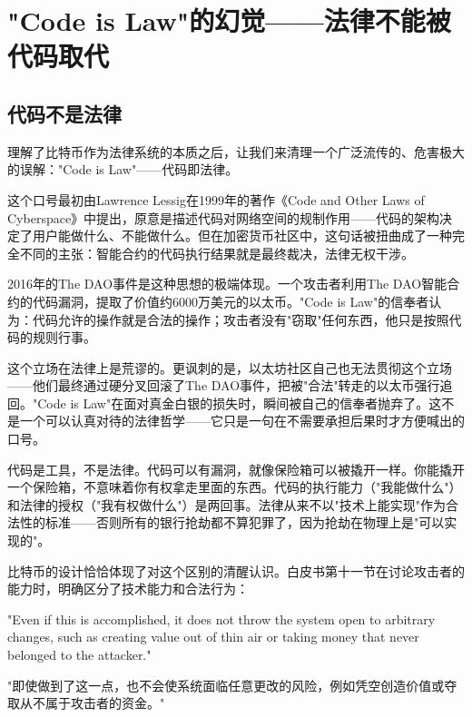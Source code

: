 \documentclass[a4paper,12pt,openany]{ctexbook}
\newenvironment{quoting}{%
  \par\vspace{0.5em}%
  \begin{list}{}{%
    \setlength{\leftmargin}{2em}%
    \setlength{\rightmargin}{2em}%
    \setlength{\parsep}{0.3em}%
    \setlength{\itemsep}{0pt}%
    \setlength{\topsep}{0pt}%
  }%
  \item\relax
}{%
  \end{list}%
  \par\vspace{0.5em}%
}
\begin{document}
\section*{"Code is Law"的幻觉——法律不能被代码取代}



\subsection*{代码不是法律}


理解了比特币作为法律系统的本质之后，让我们来清理一个广泛流传的、危害极大的误解："Code is Law"——代码即法律。

这个口号最初由Lawrence Lessig在1999年的著作《Code and Other Laws of Cyberspace》中提出，原意是描述代码对网络空间的规制作用——代码的架构决定了用户能做什么、不能做什么。但在加密货币社区中，这句话被扭曲成了一种完全不同的主张：智能合约的代码执行结果就是最终裁决，法律无权干涉。

2016年的The DAO事件是这种思想的极端体现。一个攻击者利用The DAO智能合约的代码漏洞，提取了价值约6000万美元的以太币。"Code is Law"的信奉者认为：代码允许的操作就是合法的操作；攻击者没有"窃取"任何东西，他只是按照代码的规则行事。

这个立场在法律上是荒谬的。更讽刺的是，以太坊社区自己也无法贯彻这个立场——他们最终通过硬分叉回滚了The DAO事件，把被"合法"转走的以太币强行追回。"Code is Law"在面对真金白银的损失时，瞬间被自己的信奉者抛弃了。这不是一个可以认真对待的法律哲学——它只是一句在不需要承担后果时才方便喊出的口号。

代码是工具，不是法律。代码可以有漏洞，就像保险箱可以被撬开一样。你能撬开一个保险箱，不意味着你有权拿走里面的东西。代码的执行能力（"我能做什么"）和法律的授权（"我有权做什么"）是两回事。法律从来不以"技术上能实现"作为合法性的标准——否则所有的银行抢劫都不算犯罪了，因为抢劫在物理上是"可以实现的"。

比特币的设计恰恰体现了对这个区别的清醒认识。白皮书第十一节在讨论攻击者的能力时，明确区分了技术能力和合法行为：


\begin{quoting}
\small
"Even if this is accomplished, it does not throw the system open to arbitrary changes, such as creating value out of thin air or taking money that never belonged to the attacker."

"即使做到了这一点，也不会使系统面临任意更改的风险，例如凭空创造价值或夺取从不属于攻击者的资金。"
\end{quoting}
\end{document}
